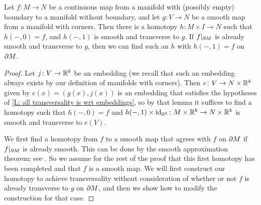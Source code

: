 \begin{theorem}\label{T: basic trans}
	Let $f \colon M \to N$ be a continuous map from a manifold with (possibly empty) boundary to a manifold without boundary, and let $g \colon V \to N$ be a smooth map from a manifold with corners.
	Then there is a homotopy $h \colon M \times I \to N$ such that $h(-,0) = f$, and $h(-,1)$ is smooth and transverse to $g$.
	If $f|_{\partial M}$ is already smooth and transverse to $g$, then we can find such an $h$ with $h(-,1) = f$ on $\partial M$.
\end{theorem}

\begin{proof}
	Let $j \colon V \to \mathbb{R}^k$ be an embedding (we recall that such an embedding always exists by our definition of manifolds with corners).
	Then $e \colon V \to N \times \mathbb{R}^k$ given by $e(x) = (g(x),j(x))$ is an embedding that satisfies the hypotheses of \cref{L: all transversality is wrt embeddings}, so by that lemma it suffices to find a homotopy such that $h(-,0) = f$ and $h(-,1) \times \mathrm{id}_{\mathbb{R}^k} \colon M \times \mathbb{R}^k \to N \times \mathbb{R}^k$ is smooth and
	transverse to $e(V)$.

	We first find a homotopy from $f$ to a smooth map that agrees with $f$ on $\partial M$ if $f|_{\partial M}$ is already smooth.
	This can be done by the smooth approximation theorem; see \cite[Theorem III.2.5]{Kos93}.
	So we assume for the rest of the proof that this first homotopy has been completed and that $f$ is a smooth map.
	We will first construct our homotopy to achieve transversality without consideration of whether or not $f$ is already transverse to $g$ on $\partial M$, and then we show how to modify the construction for that case.


\end{proof}
